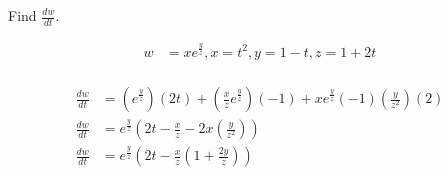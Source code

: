 Find $\frac{dw}{dt}$.

\begin{align*}
    w &= xe^\frac{y}{z}, x = t^2, y = 1 - t, z = 1 + 2t \\
\end{align*}

\begin{solution}
\begin{align*}
    \frac{dw}{dt} &= \left(e^\frac{y}{z}\right)(2t) + \left(\frac{x}{z}e^\frac{y}{z}\right)(-1) + xe^\frac{y}{z}(-1)\left(\frac{y}{z^2}\right)(2) \\
    \frac{dw}{dt} &= e^\frac{y}{z}\left(2t - \frac{x}{z} - 2x \left(\frac{y}{z^2}\right)\right) \\
    \frac{dw}{dt} &= e^\frac{y}{z}\left(2t - \frac{x}{z}\left(1 + \frac{2y}{z}\right)\right)
\end{align*}
\end{solution}
